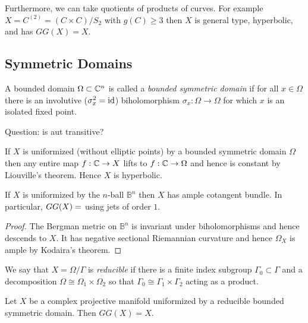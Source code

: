 \documentclass[main.tex]{subfiles}
\begin{document}
Furthermore, we can take quotients of products of curves. For example $X = C^{(2)} = (C \times C) / S_2$ with $g(C) \ge 3$ then $X$ is general type, hyperbolic, and has $GG(X) = X$.

\subsection{Symmetric Domains}

\begin{defn}
A bounded domain $\Omega \subset \mathbb{C}^n$ is called a \textit{bounded symmetric domain} if for all $x \in \Omega$ there is an involutive ($\sigma_x^2 = \mathrm{id}$) biholomorphism $\sigma_x : \Omega \to \Omega$ for which $x$ is an isolated fixed point.
\end{defn}

Question: is aut transitive?

\begin{rmk}
If $X$ is uniformized (without elliptic points) by a bounded symmetric domain $\Omega$ then any entire map $f : \mathbb{C} \to X$ lifts to $f : \mathbb{C} \to \Omega$ and hence is constant by Liouville's theorem. Hence $X$ is hyperbolic.
\end{rmk}

\begin{theorem}
If $X$ is uniformized by the $n$-ball $\mathbb{B}^n$ then $X$ has ample cotangent bundle. In particular, $GG(X) = \empty$ using jets of order $1$.
\end{theorem}

\begin{proof}
The Bergman metric on $\mathbb{B}^n$ is invariant under biholomorphisms and hence descends to $X$. It has negative sectional Riemannian curvature and hence $\Omega_X$ is ample by Kodaira's theorem.
\end{proof}

\begin{defn}
We say that $X = \Omega / \Gamma$ is \textit{reducible} if there is a finite index subgroup $\Gamma_0 \subset \Gamma$ and a decomposition $\Omega \cong \Omega_1 \times \Omega_2$ so that $\Gamma_0 \cong \Gamma_1 \times \Gamma_2$ acting as a product.
\end{defn}

\begin{theorem}
Let $X$ be a complex projective manifold uniformized by a reducible bounded symmetric domain. Then $GG(X) = X$.
\end{theorem}

\ifSubfilesClassLoaded{%
  
  
}{}
\end{document}
